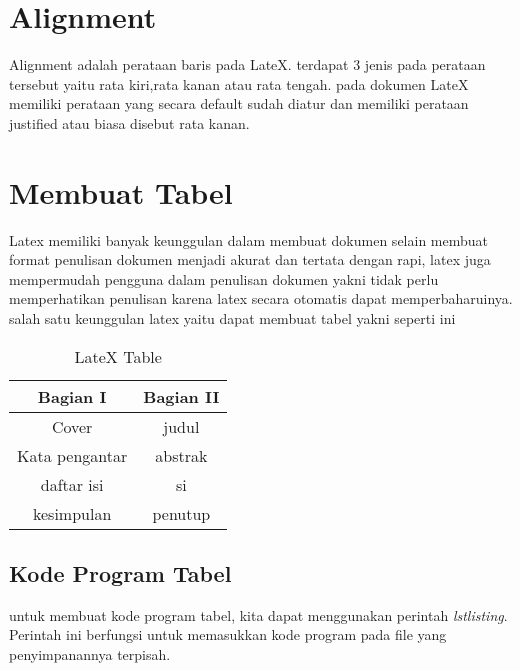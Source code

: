 \section{Alignment}
Alignment adalah perataan baris pada LateX. terdapat 3 jenis pada perataan tersebut yaitu rata kiri,rata kanan atau rata tengah. pada dokumen LateX memiliki perataan yang secara default sudah diatur dan memiliki perataan justified atau biasa disebut rata kanan.

\section{Membuat Tabel}
Latex memiliki banyak keunggulan dalam membuat dokumen selain membuat format penulisan dokumen menjadi akurat dan tertata dengan rapi, latex juga mempermudah pengguna dalam penulisan dokumen yakni tidak perlu memperhatikan penulisan karena latex secara otomatis dapat memperbaharuinya. salah satu keunggulan latex yaitu dapat membuat tabel yakni seperti ini

\begin{table}[h]
\caption{LateX Table}
\centering
\begin{tabular}{|c|c|}
\hline
\textbf{Bagian I}&\textbf{Bagian II}\\
\hline
Cover&judul\\
\hline
Kata pengantar&abstrak\\
\hline
daftar isi&si\\
\hline
kesimpulan&penutup\\
\hline
\end{tabular}
\label{table:permisalan}
\end{table}

\subsection{Kode Program Tabel}
untuk membuat kode program tabel, kita dapat menggunakan perintah \textit{lstlisting}. Perintah ini  berfungsi untuk memasukkan kode program pada file yang penyimpanannya terpisah.

